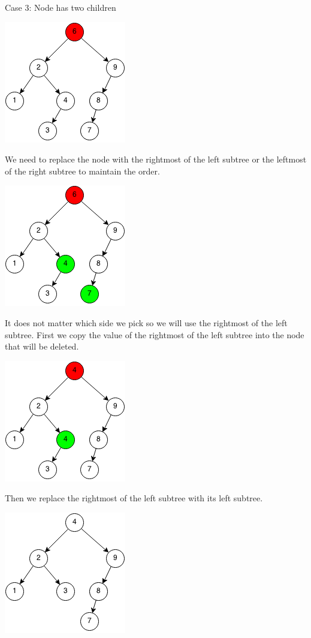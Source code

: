 \documentclass[11pt,oneside]{book}
\makeatletter
\def\maxwidth#1{\ifdim\Gin@nat@width>#1 #1\else\Gin@nat@width\fi}
\makeatother
\begin{document}
Case 3: Node has two children

\includegraphics[width=\maxwidth{\textwidth}]{bst-rem-case31.png}

We need to replace the node with the rightmost of the left subtree or the leftmost of the right subtree to maintain the order.

\includegraphics[width=\maxwidth{\textwidth}]{bst-rem-case32.png}

It does not matter which side we pick so we will use the rightmost of the left subtree. First we copy the value of the rightmost of the left subtree into the node that will be deleted.

\includegraphics[width=\maxwidth{\textwidth}]{bst-rem-case33.png}

Then we replace the rightmost of the left subtree with its left subtree.

\includegraphics[width=\maxwidth{\textwidth}]{bst-rem-case34.png}
\end{document}
